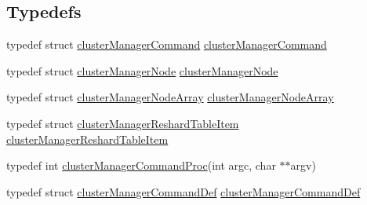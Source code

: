 \subsection*{Typedefs}
\begin{DoxyCompactItemize}
\item 
typedef struct \hyperlink{structcluster_manager_command}{cluster\+Manager\+Command} \hyperlink{redis-cli_8c_a4a287731949d49a0194c4ba6bf5d7523}{cluster\+Manager\+Command}
\item 
typedef struct \hyperlink{structcluster_manager_node}{cluster\+Manager\+Node} \hyperlink{redis-cli_8c_add369fe815d567f6e0b8d573384e3fa6}{cluster\+Manager\+Node}
\item 
typedef struct \hyperlink{structcluster_manager_node_array}{cluster\+Manager\+Node\+Array} \hyperlink{redis-cli_8c_a7c1f7b7c2d2a1f7b366cf62f9319db26}{cluster\+Manager\+Node\+Array}
\item 
typedef struct \hyperlink{structcluster_manager_reshard_table_item}{cluster\+Manager\+Reshard\+Table\+Item} \hyperlink{redis-cli_8c_ae4374bcd170566d368a299bb459e5eb1}{cluster\+Manager\+Reshard\+Table\+Item}
\item 
typedef int \hyperlink{redis-cli_8c_a8e9cfad74d28bc05c1e55864714a460f}{cluster\+Manager\+Command\+Proc}(int argc, char $\ast$$\ast$argv)
\item 
typedef struct \hyperlink{structcluster_manager_command_def}{cluster\+Manager\+Command\+Def} \hyperlink{redis-cli_8c_a708569b560d5de7d6b6f472cb70e41b5}{cluster\+Manager\+Command\+Def}
\end{DoxyCompactItemize}
